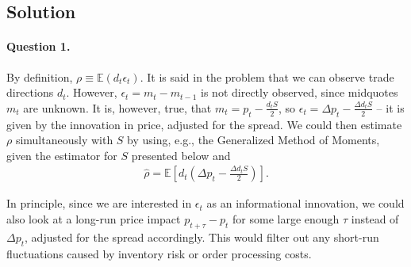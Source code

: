 \documentclass[a4paper]{article}
\newif\ifsolutions
\begin{document}
\ifsolutions
\subsection*{Solution}
	\paragraph{Question 1.}
	By definition, $\rho \equiv \mathbb{E}(d_t \epsilon_{t})$. It is said in the problem that we can observe trade directions $d_t$. However, $\epsilon_t = m_t - m_{t-1}$ is not directly observed, since midquotes $m_t$ are unknown. It is, however, true, that $m_t = p_t - \frac{d_t S}{2}$, so $\epsilon_{t} = \Delta p_t - \frac{\Delta d_t S}{2}$ -- it is given by the innovation in price, adjusted for the spread. We could then estimate $\rho$ simultaneously with $S$ by using, e.g., the Generalized Method of Moments, given the estimator for $S$ presented below and
	\begin{align*}
		\hat{\rho} = \mathbb{E} \left[ d_t \left( \Delta p_t - \frac{\Delta d_t S}{2} \right) \right].
	\end{align*}
	
	In principle, since we are interested in $\epsilon_{t}$ as an informational innovation, we could also look at a long-run price impact $p_{t+\tau} - p_t$ for some large enough $\tau$ instead of $\varDelta p_t$, adjusted for the spread accordingly. This would filter out any short-run fluctuations caused by inventory risk or order processing costs.
	
	
\end{document}
